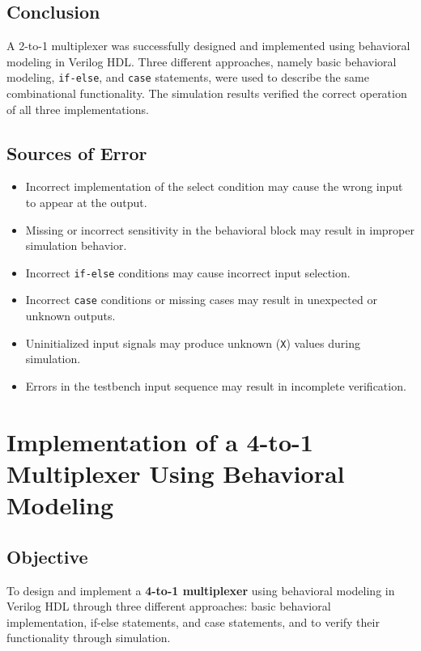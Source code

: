 \documentclass[12pt,a4paper]{report}
\begin{document}
\section{Conclusion}

A 2-to-1 multiplexer was successfully designed and implemented using behavioral modeling in Verilog HDL. Three different approaches, namely basic behavioral modeling, \texttt{if-else}, and \texttt{case} statements, were used to describe the same combinational functionality. The simulation results verified the correct operation of all three implementations.

\vspace{1.5cm}

\section{Sources of Error}

\begin{itemize}
    \item Incorrect implementation of the select condition may cause the wrong input to appear at the output.
    \item Missing or incorrect sensitivity in the behavioral block may result in improper simulation behavior.
    \item Incorrect \texttt{if-else} conditions may cause incorrect input selection.
    \item Incorrect \texttt{case} conditions or missing cases may result in unexpected or unknown outputs.
    \item Uninitialized input signals may produce unknown (\texttt{X}) values during simulation.
    \item Errors in the testbench input sequence may result in incomplete verification.
\end{itemize}

\vspace{2.5cm}
\chapter{Implementation of a 4-to-1 Multiplexer Using Behavioral Modeling}
\label{ch:pdf21}

\section{Objective}

To design and implement a \textbf{4-to-1 multiplexer} using behavioral modeling in Verilog HDL through three different approaches: basic behavioral implementation, if-else statements, and case statements, and to verify their functionality through simulation.
\end{document}
